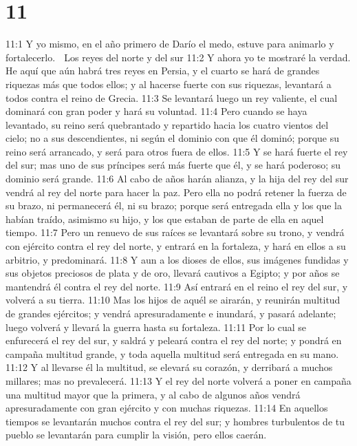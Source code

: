 \chapter{11}

11:1 Y yo mismo, en el año primero de Darío el medo, estuve para animarlo y fortalecerlo.  

Los reyes del norte y del sur  
11:2 Y ahora yo te mostraré la verdad. He aquí que aún habrá tres reyes en Persia, y el cuarto se hará de grandes riquezas más que todos ellos; y al hacerse fuerte con sus riquezas, levantará a todos contra el reino de Grecia.  
11:3 Se levantará luego un rey valiente, el cual dominará con gran poder y hará su voluntad.  
11:4 Pero cuando se haya levantado, su reino será quebrantado y repartido hacia los cuatro vientos del cielo; no a sus descendientes, ni según el dominio con que él dominó; porque su reino será arrancado, y será para otros fuera de ellos.  
11:5 Y se hará fuerte el rey del sur; mas uno de sus príncipes será más fuerte que él, y se hará poderoso; su dominio será grande.  
11:6 Al cabo de años harán alianza, y la hija del rey del sur vendrá al rey del norte para hacer la paz. Pero ella no podrá retener la fuerza de su brazo, ni permanecerá él, ni su brazo; porque será entregada ella y los que la habían traído, asimismo su hijo, y los que estaban de parte de ella en aquel tiempo.  
11:7 Pero un renuevo de sus raíces se levantará sobre su trono, y vendrá con ejército contra el rey del norte, y entrará en la fortaleza, y hará en ellos a su arbitrio, y predominará.  
11:8 Y aun a los dioses de ellos, sus imágenes fundidas y sus objetos preciosos de plata y de oro, llevará cautivos a Egipto; y por años se mantendrá él contra el rey del norte.  
11:9 Así entrará en el reino el rey del sur, y volverá a su tierra.  
11:10 Mas los hijos de aquél se airarán, y reunirán multitud de grandes ejércitos; y vendrá apresuradamente e inundará, y pasará adelante; luego volverá y llevará la guerra hasta su fortaleza.  
11:11 Por lo cual se enfurecerá el rey del sur, y saldrá y peleará contra el rey del norte; y pondrá en campaña multitud grande, y toda aquella multitud será entregada en su mano.  
11:12 Y al llevarse él la multitud, se elevará su corazón, y derribará a muchos millares; mas no prevalecerá.  
11:13 Y el rey del norte volverá a poner en campaña una multitud mayor que la primera, y al cabo de algunos años vendrá apresuradamente con gran ejército y con muchas riquezas.  
11:14 En aquellos tiempos se levantarán muchos contra el rey del sur; y hombres turbulentos de tu pueblo se levantarán para cumplir la visión, pero ellos caerán.  
